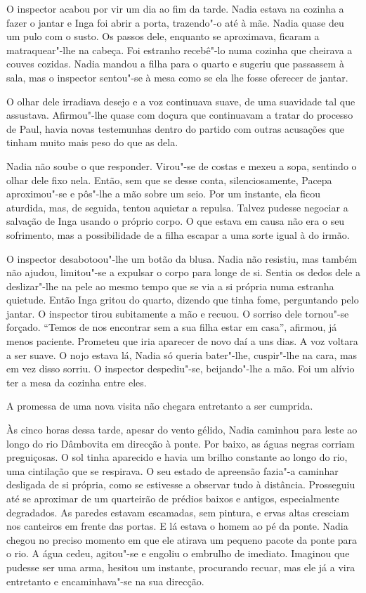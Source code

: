 \bigskip

O inspector acabou por vir um dia ao fim da tarde. Nadia estava na
cozinha a fazer o jantar e Inga foi abrir a porta, trazendo"-o até à mãe.
Nadia quase deu um pulo com o susto. Os passos dele, enquanto se
aproximava, ficaram a matraquear"-lhe na cabeça. Foi estranho recebê"-lo numa cozinha que cheirava a couves cozidas. Nadia mandou a filha
para o quarto e sugeriu que passassem à sala, mas o inspector sentou"-se
à mesa como se ela lhe fosse oferecer de jantar.

O olhar dele irradiava desejo e a voz continuava suave, de uma suavidade
tal que assustava. Afirmou"-lhe quase com doçura que continuavam a tratar
do processo de Paul, havia novas testemunhas dentro do partido com
outras acusações que tinham muito mais peso do que as dela.

Nadia não soube o que responder. Virou"-se de costas e mexeu a sopa,
sentindo o olhar dele fixo nela. Então, sem que se desse conta,
silenciosamente, Pacepa aproximou"-se e pôs"-lhe a mão sobre um seio. Por
um instante, ela ficou
aturdida, mas, de seguida, tentou aquietar a repulsa. Talvez pudesse
negociar a salvação de Inga usando o próprio corpo. O que estava em
causa não era o seu sofrimento, mas a possibilidade de a filha escapar a
uma sorte igual à do irmão.

O inspector desabotoou"-lhe um botão da blusa. Nadia não resistiu, mas
também não ajudou, limitou"-se a expulsar o corpo para longe de si.
Sentia os dedos dele a deslizar"-lhe na pele ao mesmo tempo que se via a si própria numa estranha
quietude. Então Inga gritou do quarto, dizendo que tinha fome,
perguntando pelo jantar. O inspector tirou subitamente a mão e recuou. O
sorriso dele tornou"-se forçado. ``Temos de nos encontrar sem a sua
filha estar em casa'', afirmou, já menos paciente. Prometeu que iria
aparecer de novo daí a uns dias. A voz voltara a ser suave. O nojo
estava lá, Nadia só queria bater"-lhe, cuspir"-lhe na cara, mas em vez
disso sorriu. O inspector despediu"-se, beijando"-lhe a mão. Foi um alívio
ter a mesa da cozinha entre eles.

A promessa de uma nova visita não chegara entretanto a ser cumprida.

\bigskip

Às cinco horas dessa tarde, apesar do vento gélido, Nadia caminhou para
leste ao longo do rio Dâmbovita em direcção à ponte. Por baixo, as águas
negras corriam preguiçosas. O sol tinha aparecido e havia um brilho
constante ao longo do rio, uma cintilação que se respirava. O seu
estado de apreensão fazia"-a caminhar desligada de si própria, como se
estivesse a observar tudo à distância. Prosseguiu até se aproximar de um
quarteirão de prédios
baixos e antigos, especialmente degradados. As paredes estavam
escamadas, sem pintura, e ervas altas cresciam nos canteiros em frente
das portas. E lá estava o homem ao pé da ponte. Nadia chegou no preciso
momento em que ele atirava um pequeno pacote da ponte para o rio. A água
cedeu, agitou"-se e engoliu o embrulho de imediato. Imaginou que
pudesse ser uma arma, hesitou um instante, procurando recuar, mas ele
já a vira entretanto e encaminhava"-se na sua direcção.

